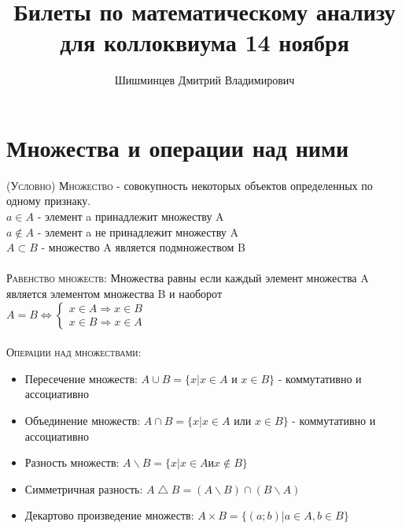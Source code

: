 \documentclass[14pt]{article}
\title{Билеты по математическому анализу для коллоквиума 14 ноября }
\author{Шишминцев Дмитрий Владимирович}
\begin{document}
    \maketitle
    \tableofcontents
    \newpage
    
    \section{Множества и операции над ними}
        \textsc{(Условно) Множество  }
         - совокупность некоторых объектов определенных по одному признаку. \\
        $ a \in A $ - элемент a принадлежит множеству A \\ 
        $ a \notin A $ - элемент a не принадлежит множеству A \\ 
        $ A \subset B $ - множество A является подмножеством B \\
        \\
        \textsc{Равенство множеств: } Множества равны если каждый элемент множества A является элементом множества B и наоборот \\
        $A = B \Leftrightarrow \begin{cases}
            x \in A \Rightarrow x \in B \\ 
            x \in B \Rightarrow x \in A
        \end{cases}$\\
        \\
        \textsc{Операции над множествами:}
        \begin{itemize}
            \item Пересечение множеств: $ A \cup B = \{ x| x \in A$ и $x \in B \}$ - коммутативно и ассоциативно
            \item Объединение множеств: $ A \cap B = \{ x | x \in A$ или $x \in B \}$ - коммутативно и ассоциативно
            \item Разность множеств: $ A \backslash B = \{ x | x \in A $и$ x \notin B \} $
            \item Симметричная разность: $ A \bigtriangleup B = (A \backslash B) \cap (B \backslash A)$
            \item Декартово произведение множеств: $ A \times B = \{(a; b) | a \in A, b \in B \}$
        \end{itemize}
        
    
\end{document}
